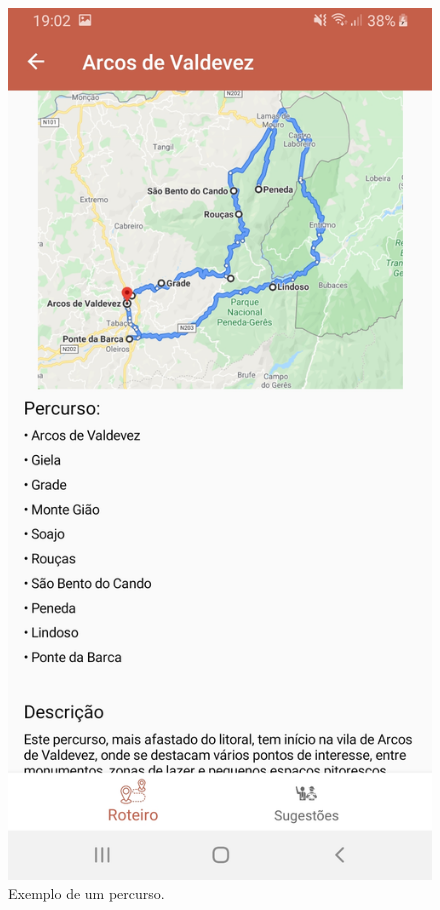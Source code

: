 \begin{figure}[H]
\centering
\includegraphics[width=0.5\linewidth]{images/percurso.jpg}
\caption{Exemplo de um percurso.}
\end{figure}